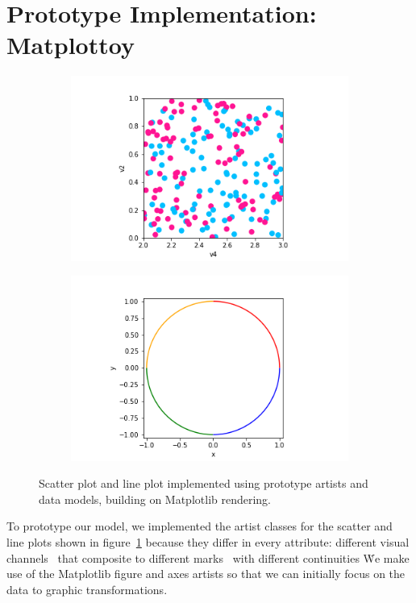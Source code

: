 \documentclass[../main.tex]{subfiles}
\begin{document}
\section{Prototype Implementation: Matplottoy}
\label{sec:implementation}
\begin{figure}[H]
    \begin{subfigure}{0.5\textwidth}
        \includegraphics[width=\textwidth]{figures/code/scatter_0.png}
    \end{subfigure}
    \begin{subfigure}{0.5\textwidth}
        \includegraphics[width=\textwidth]{figures/code/line_1.png}
    \end{subfigure}
    \caption{Scatter plot and line plot implemented using prototype artists and data models, building on Matplotlib rendering.}
    \label{fig:code_scatter_line}
\end{figure}
To prototype our model, we implemented the artist classes for the scatter and line plots shown in figure~\ref{fig:code_scatter_line} because they differ in every attribute: different visual channels \vchannel\ that composite to different marks \vmark\ with different continuities \vindex\.  We make use of the Matplotlib figure and axes artists \cite{hunterArchitectureOpenSource,hunterMatplotlib2DGraphics2007} so that we can initially focus on the data to graphic transformations. 
\end{document}
